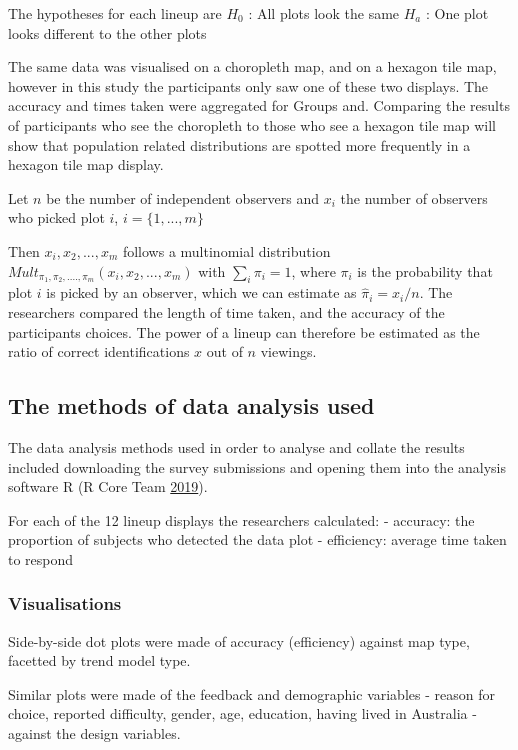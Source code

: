 \documentclass[conference,final,]{IEEEtran}
\begin{document}
The hypotheses for each lineup are \(H_0\) : All plots look the same
\(H_a\) : One plot looks different to the other plots

The same data was visualised on a choropleth map, and on a hexagon tile
map, however in this study the participants only saw one of these two
displays. The accuracy and times taken were aggregated for Groups and.
Comparing the results of participants who see the choropleth to those
who see a hexagon tile map will show that population related
distributions are spotted more frequently in a hexagon tile map display.

Let \(n\) be the number of independent observers and \(x_i\) the number
of observers who picked plot \(i\), \(i = \{1,...,m\}\)

Then \(x_i, x_2, ..., x_m\) follows a multinomial
distribution\(Mult_{\pi_1, \pi_2, ...., \pi_m}(x_i, x_2, ..., x_m)\)
with \(\sum_i \pi_i = 1\), where \(\pi_i\) is the probability that plot
\(i\) is picked by an observer, which we can estimate as
\(\hat{\pi}_i = x_i/n\). The researchers compared the length of time
taken, and the accuracy of the participants choices. The power of a
lineup can therefore be estimated as the ratio of correct
identifications \(x\) out of \(n\) viewings.

\hypertarget{the-methods-of-data-analysis-used}{%
\subsection{The methods of data analysis
used}\label{the-methods-of-data-analysis-used}}

The data analysis methods used in order to analyse and collate the
results included downloading the survey submissions and opening them
into the analysis software R (R Core Team
\protect\hyperlink{ref-RCore}{2019}).

For each of the 12 lineup displays the researchers calculated: -
accuracy: the proportion of subjects who detected the data plot -
efficiency: average time taken to respond

\hypertarget{visualisations}{%
\subsubsection{Visualisations}\label{visualisations}}

Side-by-side dot plots were made of accuracy (efficiency) against map
type, facetted by trend model type.

Similar plots were made of the feedback and demographic variables -
reason for choice, reported difficulty, gender, age, education, having
lived in Australia - against the design variables.
\end{document}
